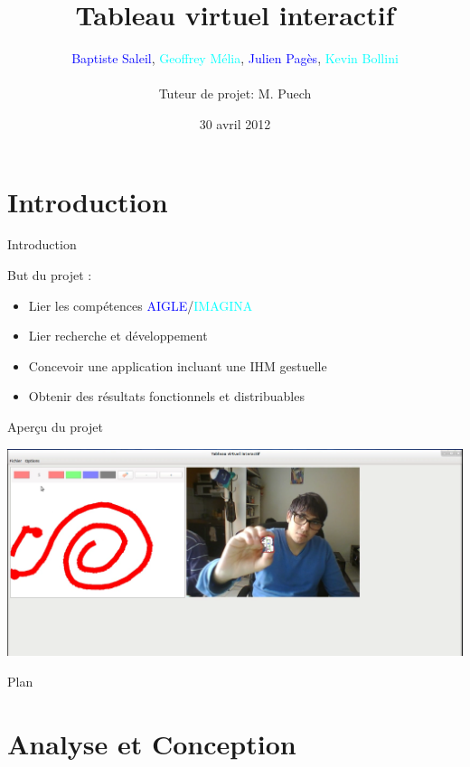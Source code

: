 \documentclass{beamer}
\title{Tableau virtuel interactif}
\author{\textcolor{blue}{Baptiste Saleil}, \textcolor{cyan}{Geoffrey Mélia}, \textcolor{blue}{Julien Pagès}, \textcolor{cyan}{Kevin Bollini} \\ \ \\Tuteur de projet: M. Puech}
\date{30 avril 2012}
\begin{document}
	\begin{frame}
		\titlepage
	\end{frame}

	\section{Introduction}
	\begin{frame}{Introduction}
        
	\begin{block}{But du projet :}
               \begin{itemize}
			\item Lier les compétences \textcolor{blue}{AIGLE}/\textcolor{cyan}{IMAGINA}
			\item Lier recherche et développement
			\item Concevoir une application incluant une IHM gestuelle
			\item Obtenir des résultats fonctionnels et distribuables
		\end{itemize}
        \end{block}
            
	\end{frame}

      \begin{frame}{Aperçu du projet}
      		\begin{center}
      		\includegraphics[scale=0.25]{capture-intro.png}
      		\end{center}
      \end{frame}

      \begin{frame}{Plan}
            \tableofcontents[hideallsubsections]
      \end{frame}
            
      \section{Analyse et Conception}
\end{document}
